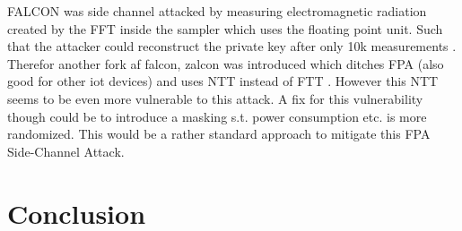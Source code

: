 \documentclass[conference]{IEEEtran}
\newcommand{\comment}[1]{}
\begin{document}
FALCON was side channel attacked by measuring electromagnetic radiation created by the FFT inside the sampler which uses the floating point unit. Such that the attacker could reconstruct the private key after only 10k measurements \cite{falcon_side_channel}. Therefor another fork af falcon, zalcon was introduced which ditches FPA (also good for other iot devices) and uses NTT instead of FTT \cite{zalcon}. However this NTT seems to be even more vulnerable to this attack\cite{falcon_side_channel}. A fix for this vulnerability though could be to introduce a masking s.t. power consumption etc. is more randomized. This would be a rather standard approach to mitigate this FPA Side-Channel Attack.

\section{Conclusion}
\comment{ %
- of course no protection against side channel etc 
- quantum fast evolving, active field of research
- smart home, smart campus, smart city
- quantum key distribution
\cite{QR_comparison}
} %



\end{document}
